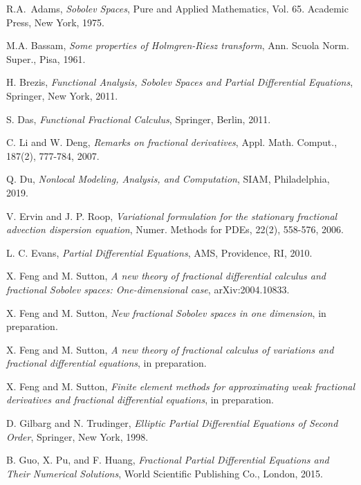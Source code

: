 \documentclass[leqno,final]{siamltex}
\numberwithin{equation}{section}
\renewcommand{\(}{\bigl(}
\renewcommand{\)}{\bigr)}
\begin{document}
\begin{thebibliography}{99}


{\sc R.A.~Adams}, 
{\em Sobolev Spaces}, 
Pure and  Applied Mathematics, Vol. 65. Academic Press, New York, 1975.

{\sc M.A. Bassam},
{\em Some properties of Holmgren-Riesz transform},
Ann. Scuola Norm. Super., Pisa,  1961.

{\sc H. Brezis},
{\em Functional Analysis, Sobolev Spaces and Partial Differential Equations},
Springer, New York, 2011.

{\sc S. Das},
{\em Functional Fractional Calculus},
Springer, Berlin, 2011.

{\sc C. Li and  W. Deng},
{\em Remarks on fractional derivatives},
Appl. Math. Comput., 187(2), 777-784, 2007.


{\sc Q. Du}, 
{\em Nonlocal Modeling, Analysis, and Computation}, 
SIAM, Philadelphia, 2019.

{\sc V. Ervin and J. P. Roop},
{\em Variational formulation for the stationary fractional advection dispersion equation},
Numer.  Methods for PDEs,  22(2), 558-576, 2006.

{\sc L. C. Evans}, 
{\em  Partial Differential Equations},  AMS, Providence, RI,  2010.

{\sc X. Feng and M. Sutton},
{\em A new theory of fractional differential calculus and fractional Sobolev spaces: One-dimensional case},
arXiv:2004.10833.

{\sc X. Feng and M. Sutton},
{\em New fractional Sobolev spaces in one dimension},
in preparation.

{\sc X. Feng and M. Sutton},
{\em  A new theory of fractional calculus of variations and fractional differential equations},
in preparation.

{\sc X. Feng and M. Sutton},
{\em  Finite element methods for approximating weak fractional  derivatives and fractional differential equations},
in preparation.

{\sc D. Gilbarg and N. Trudinger},
{\em Elliptic Partial Differential Equations of Second Order},
Springer, New York, 1998.

{\sc B. Guo, X. Pu, and  F. Huang},
{\em Fractional Partial Differential Equations and Their Numerical Solutions}, 
World Scientific Publishing Co.,  London,  2015.


\end{thebibliography}
\end{document}

